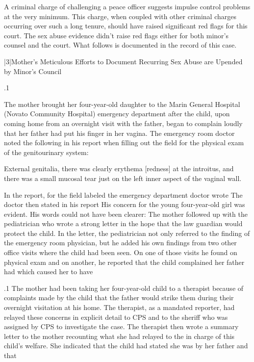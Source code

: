 \documentclass[11pt, twoside]{article}
\begin{document}
{{\nip{}%
A criminal charge of challenging a peace officer suggests impulse control
problems at the very minimum. This charge, when coupled with other
criminal charges occurring over such a long tenure, should have raised
significant red flags for this court. The sex abuse evidence didn’t raise
red flags either for both minor’s counsel and the court. What follows is
documented in the record of this case.
}%


\s|3|{Mother’s Meticulous Efforts to Document Recurring Sex Abuse are Upended by Minor’s Council}

\p.1{%
\noindent{}The mother brought her four-year-old daughter to the Marin General
Hospital (Novato Community Hospital) emergency department after
the child, upon coming home from an overnight visit with the father,
began to complain loudly that her father had put his finger in her vagina.
The emergency room doctor noted the following in his report when
filling out the field for the physical exam of the genitourinary system:

\begin{blockQuote}
External genitalia, there was clearly erythema [redness] at the introitus, and there was a small mucosal tear just on the left inner
aspect of the vaginal wall.
\end{blockQuote}

\nip{}%
In the report, for the field labeled  the emergency department doctor wrote  The doctor
then stated in his report  His
concern for the young four-year-old girl was evident. His words could
not have been clearer:  The mother
followed up with the pediatrician who wrote a strong letter in the hope
that the law guardian would protect the child. In the letter, the pediatrician not only referred to the finding of the emergency room physician,
but he added his own findings from two other office visits where the
child had been seen. On one of those visits he found on physical exam
 and on another, he reported that the child
complained her father had 
which caused her to have 
}%

\p.1{%
The mother had been taking her four-year-old child to a therapist
because of complaints made by the child that the father would strike
them during their overnight visitation at his home. The therapist, as a
mandated reporter, had relayed these concerns in explicit detail to CPS
and to the sheriff who was assigned by CPS to investigate the case. The
therapist then wrote a summary letter to the mother recounting what
she had relayed to the  in charge of this child’s welfare. She
indicated that the child had stated she was  by her father and that
}%

}
\end{document}
